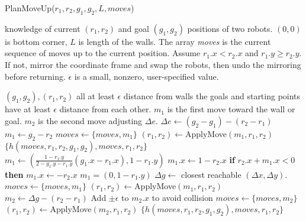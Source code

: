 \begin{algorithm}
\caption{{\sc PlanMoveUp}($r_1,r_2,g_1,g_2,L, moves$)}\label{alg:Wallup}
\begin{algorithmic}[1]
\Require knowledge of current $(r_1,r_2)$ and goal $(g_1,g_2)$ positions of  two robots. 
$(0,0)$ is bottom corner,
 $L$ is length of the walls. 
 The array \emph{moves} is the current sequence of moves up to the current position.
 Assume $r_1.x < r_2.x$ and $r_1.y \geq r_2.y$. If not, mirror the coordinate frame and swap the robots, then undo the mirroring before returning.
 $\epsilon $ is a small, nonzero, user-specified value.
 
\Ensure $(g_1, g_2) , (r_1, r_2)$ all at least $\epsilon$ distance from walls the goals and starting points have at least $\epsilon$ distance from each other.  
$m_1$ is the first move toward the wall or goal.
 $m_2$ is the second move adjusting $\Delta e$.
\State $\Delta e \gets (g_2 - g_1)- (r_2- r_1)$
 
\State $m_1  \gets g_2 -  r_2$
\State $moves \gets \{ moves,   m_1 \}$
\State $(r_1,r_2) \gets ${\sc ApplyMove}$(m_1,r_1,r_2)$
\State \Return $\{h(moves, r_1,r_2,g_1,g_2), moves,r_1,r_2\}$
\EndIf
{} 
\State $m_1 \gets \left(\frac{1-r_1.y}{2-g_1.y-r_1.y} (g_1.x -r_1.x), 1-r_1.y \right)$
\State $m_1.x \gets 1- r_2.x$
\Else \textbf{ if} {$r_2.x + m_1.x < 0$}  \textbf{then}
\State $m_1.x \gets -r_2.x$
\EndIf
\Else 
\State $m_1 = (0, 1-r_1.y)$
\State $\Delta g \gets $ closest reachable $(\Delta x,\Delta y)$.
\EndIf
\State $moves \gets \{ moves,   m_1\}$
\State $(r_1,r_2) \gets ${\sc ApplyMove}$(m_1,r_1,r_2)$
\State $m_2 \gets \Delta g -  (r_2- r_1)$
\State Add $\pm \epsilon$ to $m_2.x$ to avoid collision
\EndIf
\State $moves \gets \{ moves,   m_2\}$
\State $(r_1,r_2) \gets ${\sc ApplyMove}$(m_2,r_1,r_2)$
\State \Return $\{h(moves, r_1,r_2,g_1,g_2), moves,r_1,r_2\}$
\end{algorithmic}
\end{algorithm}








